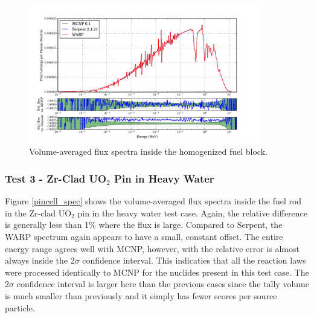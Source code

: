 \documentclass[preprint,12pt]{elsarticle}
\begin{document}
\begin{figure}[h!]
\centering
\includegraphics[width=0.9\textwidth,trim= 1cm 0cm 1cm 0cm]{graphics/homfuel_spec.pdf}
\caption{Volume-averaged flux spectra inside the homogenized fuel block. \label{homfuel_spec} }
\end{figure}

\newpage
\subsubsection{Test 3 - Zr-Clad UO$_2$ Pin in Heavy Water}

Figure \ref{pincell_spec} shows the volume-averaged flux spectra inside the fuel rod in the Zr-clad UO$_2$ pin in the heavy water test case.  Again, the relative difference is generally less than 1\% where the flux is large.  Compared to Serpent, the WARP spectrum again appears to have a small, constant offset.  The entire energy range agrees well with MCNP, however, with the relative error is almost always inside the 2$\sigma$ confidence interval.  This indicaties that all the reaction laws were processed identically to MCNP for the nuclides present in this test case.  The 2$\sigma$ confidence interval is larger here than the previous cases since the tally volume is much smaller than previously and it simply has fewer scores per source particle.

\end{document}
